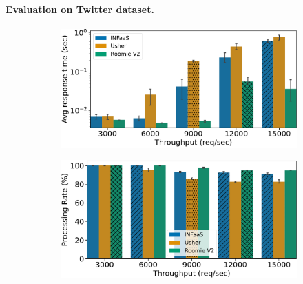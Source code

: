 \paragraph{Evaluation on Twitter dataset.}

\begin{figure}[h!]
	\centering
	\begin{subfigure}[b]{0.45\textwidth}
		\centering
		\includegraphics[width=\textwidth]{chapters/roomie/images/NvidiaA100/twitter-all-models/response_time.pdf}
	\end{subfigure}
	\hfill
	\begin{subfigure}[b]{0.45\textwidth}
		\centering
		\includegraphics[width=\textwidth]{chapters/roomie/images/NvidiaA100/twitter-all-models/normalized.pdf}
	\end{subfigure}
	
	\vspace{0.5cm} %
	

\end{figure}
